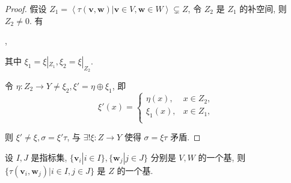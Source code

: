 \documentclass{ctexart}
\begin{document}
\begin{proof}
    假设 $Z_1=\left<\tau(\boldsymbol{v},\boldsymbol{w})|\boldsymbol{v}\in V,\boldsymbol{w}\in W\right>\subsetneq Z$, 令 $Z_2$ 是 $Z_1$ 的补空间, 则 $Z_2\neq0$. 有
    \begin{center}
        ,
    \end{center}

    其中 $\xi_1=\xi|_{Z_1},\xi_2=\xi|_{Z_2}$.
    
    令 $\eta:Z_2\to Y\neq\xi_2,\xi'=\eta\oplus\xi_1$, 即
    \[\xi'(x)=\begin{cases}
        \eta(x), & x\in Z_2, \\
        \xi_1(x), & x\in Z_1, \\
    \end{cases}\]

    则 $\xi'\neq\xi,\sigma=\xi'\tau$, 与 $\exists!\xi:Z\to Y$ 使得 $\sigma=\xi\tau$ 矛盾.
\end{proof}
\begin{theorem}\label{t1.8}
    设 $I,J$ 是指标集, $\{\boldsymbol{v}_i|i\in I\},\{\boldsymbol{w}_j|j\in J\}$ 分别是 $V,W$ 的一个基, 则 $\{\tau(\boldsymbol{v}_i,\boldsymbol{w}_j)|i\in I,j\in J\}$ 是 $Z$ 的一个基.
\end{theorem}
\end{document}
